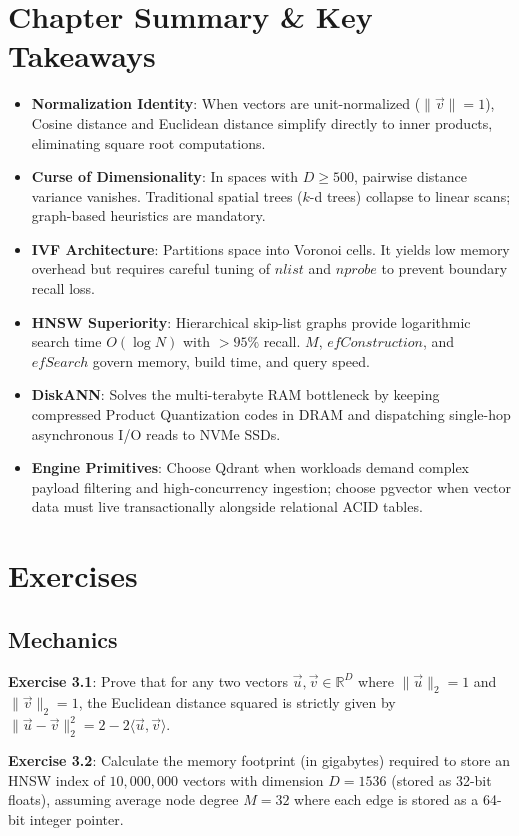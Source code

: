 \section{Chapter Summary \& Key Takeaways}
\begin{itemize}[leftmargin=18pt]
  \item \textbf{Normalization Identity}: When vectors are unit-normalized ($\|\vec{v}\|=1$), Cosine distance and Euclidean distance simplify directly to inner products, eliminating square root computations.
  \item \textbf{Curse of Dimensionality}: In spaces with $D \ge 500$, pairwise distance variance vanishes. Traditional spatial trees ($k$-d trees) collapse to linear scans; graph-based heuristics are mandatory.
  \item \textbf{IVF Architecture}: Partitions space into Voronoi cells. It yields low memory overhead but requires careful tuning of $nlist$ and $nprobe$ to prevent boundary recall loss.
  \item \textbf{HNSW Superiority}: Hierarchical skip-list graphs provide logarithmic search time $O(\log N)$ with $>95\%$ recall. $M$, $efConstruction$, and $efSearch$ govern memory, build time, and query speed.
  \item \textbf{DiskANN}: Solves the multi-terabyte RAM bottleneck by keeping compressed Product Quantization codes in DRAM and dispatching single-hop asynchronous I/O reads to NVMe SSDs.
  \item \textbf{Engine Primitives}: Choose Qdrant when workloads demand complex payload filtering and high-concurrency ingestion; choose pgvector when vector data must live transactionally alongside relational ACID tables.
\end{itemize}

\section{Exercises}

\subsection*{Mechanics}
\textbf{Exercise 3.1}: Prove that for any two vectors $\vec{u}, \vec{v} \in \mathbb{R}^D$ where $\|\vec{u}\|_2 = 1$ and $\|\vec{v}\|_2 = 1$, the Euclidean distance squared is strictly given by $\|\vec{u} - \vec{v}\|_2^2 = 2 - 2\langle \vec{u}, \vec{v} \rangle$.

\textbf{Exercise 3.2}: Calculate the memory footprint (in gigabytes) required to store an HNSW index of $10,000,000$ vectors with dimension $D=1536$ (stored as 32-bit floats), assuming average node degree $M=32$ where each edge is stored as a 64-bit integer pointer.

